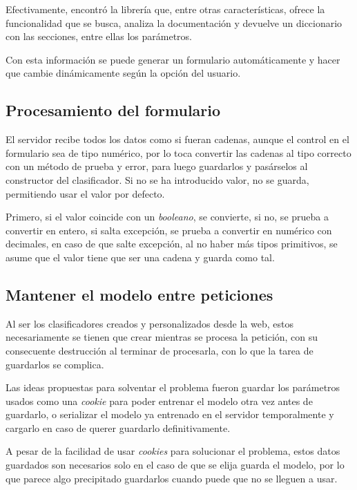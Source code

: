 Efectivamente, encontró la librería 
que, entre otras características, ofrece la funcionalidad que se busca, analiza
la documentación y devuelve un diccionario con las secciones, entre ellas los
parámetros.

Con esta información se puede generar un formulario automáticamente y hacer que
cambie dinámicamente según la opción del usuario.

\subsection{Procesamiento del formulario}

El servidor recibe todos los datos como si fueran cadenas, aunque el control en
el formulario sea de tipo numérico, por lo toca convertir las cadenas al tipo
correcto con un método de prueba y error, para luego guardarlos y pasárselos al
constructor del clasificador. Si no se ha introducido valor, no se guarda,
permitiendo usar el valor por defecto.

Primero, si el valor coincide con un \textit{booleano}, se convierte, si no, se
prueba a convertir en entero, si salta excepción, se prueba a convertir en
numérico con decimales, en caso de que salte excepción, al no haber más tipos
primitivos, se asume que el valor tiene que ser una cadena y guarda como tal.

\subsection{Mantener el modelo entre peticiones}

Al ser los clasificadores creados y personalizados desde la web, estos
necesariamente se tienen que crear mientras se procesa la petición, con su
consecuente destrucción al terminar de procesarla, con lo que la tarea de
guardarlos se complica.

Las ideas propuestas para solventar el problema fueron guardar los parámetros
usados como una \textit{cookie} para poder entrenar el modelo otra vez antes de
guardarlo, o serializar el modelo ya entrenado en el servidor temporalmente y
cargarlo en caso de querer guardarlo definitivamente.

A pesar de la facilidad de usar \textit{cookies} para solucionar el problema,
estos datos guardados son necesarios solo en el caso de que se elija guarda el
modelo, por lo que parece algo precipitado guardarlos cuando puede que no se
lleguen a usar.

